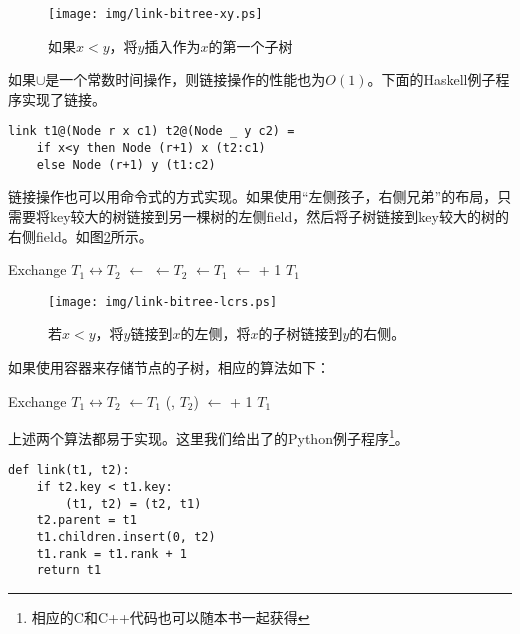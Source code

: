 \documentclass[UTF8]{article}
\begin{document}
\begin{figure}[htbp]
  \centering
  \texttt{[image: img/link-bitree-xy.ps]}
  \caption{如果$x < y$，将$y$插入作为$x$的第一个子树} \label{fig:link-xy}
\end{figure}

如果$\cup$是一个常数时间操作，则链接操作的性能也为$O(1)$。下面的Haskell例子程序实现了链接。

\lstset{language=Haskell}
\begin{lstlisting}
link t1@(Node r x c1) t2@(Node _ y c2) =
    if x<y then Node (r+1) x (t2:c1)
    else Node (r+1) y (t1:c2)
\end{lstlisting}

链接操作也可以用命令式的方式实现。如果使用“左侧孩子，右侧兄弟”的布局，只需要将key较大的树链接到另一棵树的左侧field，然后将子树链接到key较大的树的右侧field。如图\ref{fig:link-lcrs}所示。

\begin{algorithmic}[1]
    \State Exchange $T_1 \leftrightarrow T_2$
  \EndIf
  \State {} $\gets$ 
  \State {} $\gets T_2$
  \State {} $\gets T_1$
  \State {} $\gets$  + 1
  \State \Return $T_1$
\EndFunction
\end{algorithmic}

\begin{figure}[htbp]
  \centering
  \texttt{[image: img/link-bitree-lcrs.ps]}
  \caption{若$x < y$，将$y$链接到$x$的左侧，将$x$的子树链接到$y$的右侧。} \label{fig:link-lcrs}
\end{figure}

如果使用容器来存储节点的子树，相应的算法如下：

\begin{algorithmic}[1]
    \State Exchange $T_1 \leftrightarrow T_2$
  \EndIf
  \State {} $\gets T_1$
  \State {}(, $T_2$)
  \State {} $\gets$  + 1
  \State \Return $T_1$
\EndFunction
\end{algorithmic}

上述两个算法都易于实现。这里我们给出了的Python例子程序\footnote{相应的C和C++代码也可以随本书一起获得}。

\lstset{language=Python}
\begin{lstlisting}
def link(t1, t2):
    if t2.key < t1.key:
        (t1, t2) = (t2, t1)
    t2.parent = t1
    t1.children.insert(0, t2)
    t1.rank = t1.rank + 1
    return t1
\end{lstlisting}
\end{document}
